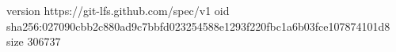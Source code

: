 version https://git-lfs.github.com/spec/v1
oid sha256:027090cbb2c880ad9c7bbfd023254588e1293f220fbc1a6b03fce107874101d8
size 306737
